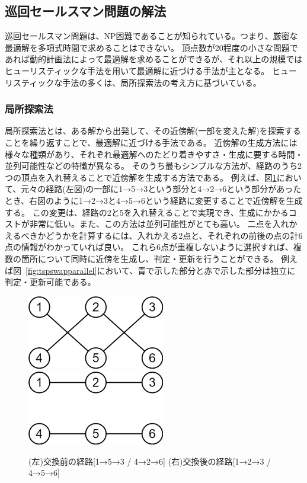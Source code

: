 \subsection{巡回セールスマン問題の解法}
巡回セールスマン問題は、NP困難であることが知られている。つまり、厳密な最適解を多項式時間で求めることはできない。
頂点数が20程度の小さな問題であれば動的計画法によって最適解を求めることができるが、それ以上の規模ではヒューリスティックな手法を用いて最適解に近づける手法が主となる。
ヒューリスティックな手法の多くは、局所探索法の考え方に基づいている。
\subsubsection{局所探索法}\label{sec:local}
局所探索法とは、ある解から出発して、その近傍解(一部を変えた解)を探索することを繰り返すことで、最適解に近づける手法である。
近傍解の生成方法には様々な種類があり、それぞれ最適解へのたどり着きやすさ・生成に要する時間・並列可能性などの特徴が異なる。
そのうち最もシンプルな方法が、経路のうち2つの頂点を入れ替えることで近傍解を生成する方法である。
例えば、図\ref{fig:tspswap}において、元々の経路(左図)の一部に1→5→3という部分と4→2→6という部分があったとき、右図のように1→2→3と4→5→6という経路に変更することで近傍解を生成する。
この変更は、経路の2と5を入れ替えることで実現でき、生成にかかるコストが非常に低い。また、この方法は並列可能性がとても高い。
二点を入れかえるべきかどうかを計算するには、入れかえる2点と、それぞれの前後の点の計6点の情報がわかっていれば良い。
これら6点が重複しないように選択すれば、複数の箇所について同時に近傍を生成し、判定・更新を行うことができる。
例えば図~\ref{fig:tspswapparallel}において、青で示した部分と赤で示した部分は独立に判定・更新可能である。
\begin{figure}[h]
    \begin{center}
        \includegraphics[width=6cm]{figure/swap_bad.png}
        \includegraphics[width=6cm]{figure/swap_good.png}
        \caption{
            (左)交換前の経路[1→5→3 / 4→2→6]
            (右)交換後の経路[1→2→3 / 4→5→6]
        }\label{fig:tspswap}
    \end{center}
\end{figure}

